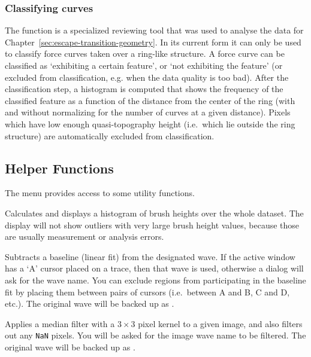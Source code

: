 \documentclass[12pt,a4paper]{article}
\begin{document}
\subsubsection{Classifying curves}
The  function is a specialized reviewing tool that was used to analyse the data for Chapter~\ref{sec:escape-transition-geometry}.
In its current form it can only be used to classify force curves taken over a ring-like structure. A force curve can be classified as  \enquote*{exhibiting a certain feature}, or \enquote*{not exhibiting the feature} (or excluded from classification, e.g. when the data quality is too bad).
After the classification step, a histogram is computed that shows the frequency of the classified feature as a function of the distance from the center of the ring (with and without normalizing for the number of curves at a given distance).
Pixels which have low enough quasi-topography height (i.e.\ which lie outside the ring structure) are automatically excluded from classification.

\subsection{Helper Functions}
The  menu provides access to some utility functions.

\begin{description}[style=nextline]

\item[Brush Histogram]
Calculates and displays a histogram of brush heights over the whole dataset.
The display will not show outliers with very large brush height values, because those are usually measurement or analysis errors.

\item[Subtract Baseline]
Subtracts a baseline (linear fit) from the designated wave. If the active window has a \enquote*{A} cursor placed on a trace, then that wave is used,
otherwise a dialog will ask for the wave name. You can exclude regions from participating in the baseline fit by placing them between pairs of cursors
(i.e.\ between A and B, C and D, etc.). The original wave will be backed up as .

\item[Median Filter Image]
Applies a median filter with a $3 \times 3$ pixel kernel to a given image, and also filters out any \texttt{NaN} pixels. You will be asked for the image wave name to be filtered. The original wave will be backed up as .

\end{description}
\end{document}
